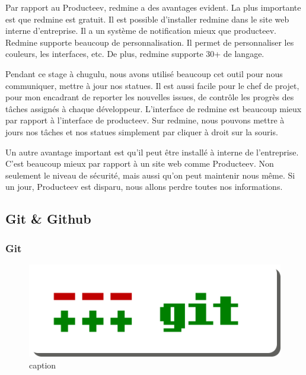 Par rapport au Producteev, redmine a des avantages evident. La plus importante est que redmine est gratuit. Il est possible d'installer redmine dans le site web interne d'entreprise. Il a un système de notification mieux que producteev. Redmine supporte beaucoup de personnalisation. Il permet de personnaliser les couleurs, les interfaces, etc. De plus, redmine supporte 30+ de langage. 

Pendant ce stage à chugulu, nous avons utilisé beaucoup cet outil pour nous communiquer, mettre à jour nos statues. Il est aussi facile pour le chef de projet, pour mon encadrant de reporter les nouvelles issues, de contrôle les progrès des tâches assignés à chaque développeur. L'interface de redmine est beaucoup mieux par rapport à l'interface de producteev. Sur redmine, nous pouvons mettre à jours nos tâches et nos statues simplement par cliquer à droit sur la souris. 

Un autre avantage important est qu'il peut être installé à interne de l'entreprise. C'est beaucoup mieux par rapport à un site web comme Producteev. Non seulement le niveau de sécurité, mais aussi qu’on peut maintenir nous même. Si un jour, Producteev est disparu, nous allons perdre toutes nos informations.



\subsection{Git \& Github} %

\subsubsection{Git} %


\begin{figure}[htbp]
	\centering
		\includegraphics[width=6in]{Image/GitLogo.png}
	\caption{caption}
	\label{fig:Image_GitLogo}
\end{figure}

